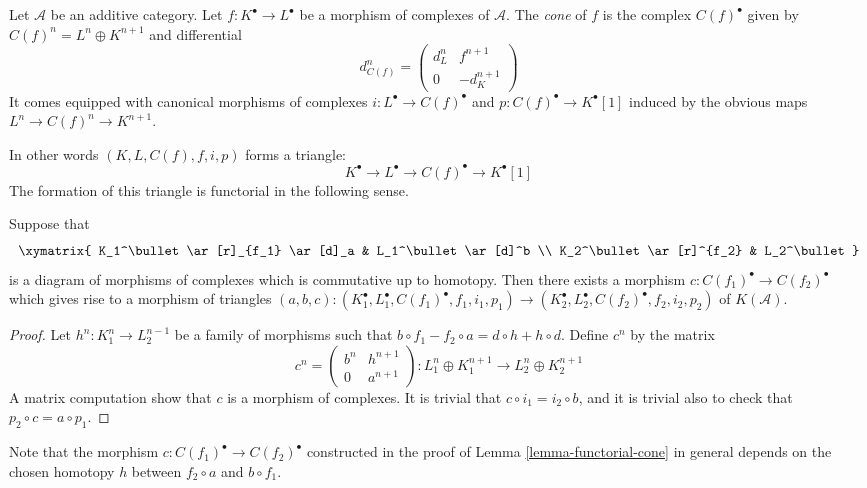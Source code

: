 \begin{definition}
\label{definition-cone}
Let $\mathcal{A}$ be an additive category.
Let $f : K^\bullet \to L^\bullet$ be a morphism of
complexes of $\mathcal{A}$. The {\it cone} of $f$
is the complex $C(f)^\bullet$ given by
$C(f)^n = L^n \oplus K^{n + 1}$ and
differential
$$
d_{C(f)}^n =
\left(
\begin{matrix}
d^n_L & f^{n + 1} \\
0 & -d_K^{n + 1}
\end{matrix}
\right)
$$
It comes equipped with canonical morphisms of complexes
$i : L^\bullet \to C(f)^\bullet$ and $p : C(f)^\bullet \to K^\bullet[1]$
induced by the obvious maps $L^n \to C(f)^n \to K^{n + 1}$.
\end{definition}

\noindent
In other words $(K, L, C(f), f, i, p)$ forms a triangle:
$$
K^\bullet \to L^\bullet \to C(f)^\bullet \to K^\bullet[1]
$$
The formation of this triangle is
functorial in the following sense.

\begin{lemma}
\label{lemma-functorial-cone}
Suppose that
$$
\xymatrix{
K_1^\bullet \ar[r]_{f_1} \ar[d]_a & L_1^\bullet \ar[d]^b \\
K_2^\bullet \ar[r]^{f_2} & L_2^\bullet
}
$$
is a diagram of morphisms of complexes which is commutative
up to homotopy. Then there exists a morphism
$c : C(f_1)^\bullet \to C(f_2)^\bullet$ which gives rise to
a morphism of triangles
$(a, b, c) : (K_1^\bullet, L_1^\bullet, C(f_1)^\bullet, f_1, i_1, p_1)
\to
(K_2^\bullet, L_2^\bullet, C(f_2)^\bullet, f_2, i_2, p_2)$
of $K(\mathcal{A})$.
\end{lemma}

\begin{proof}
Let $h^n : K_1^n \to L_2^{n - 1}$ be a family of morphisms such that
$b \circ f_1 - f_2 \circ a= d \circ h + h \circ d$.
Define $c^n$ by the matrix
$$
c^n =
\left(
\begin{matrix}
b^n & h^{n + 1} \\
0 & a^{n + 1}
\end{matrix}
\right) :
L_1^n \oplus K_1^{n + 1} \to L_2^n \oplus K_2^{n + 1}
$$
A matrix computation show that $c$ is a morphism of complexes.
It is trivial that $c \circ i_1 = i_2 \circ b$, and it is
trivial also to check that $p_2 \circ c = a \circ p_1$.
\end{proof}

\noindent
Note that the morphism $c : C(f_1)^\bullet \to C(f_2)^\bullet$
constructed in the
proof of Lemma \ref{lemma-functorial-cone} in general depends on the
chosen homotopy $h$ between $f_2 \circ a$ and $b \circ f_1$.

